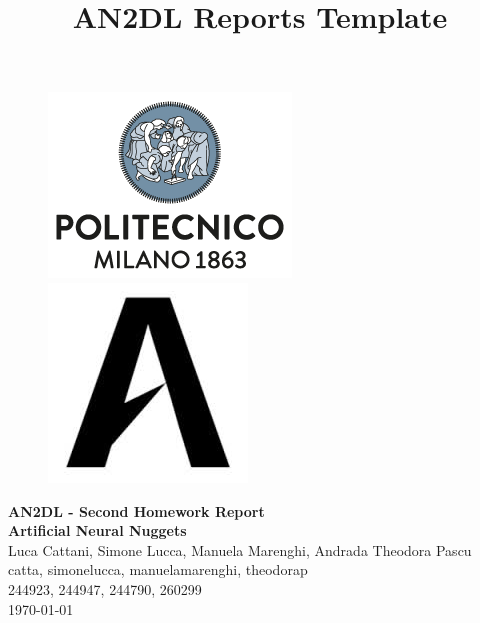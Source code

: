 \documentclass[11pt]{article}
\title{AN2DL Reports Template}
\begin{document}
    
    \begin{figure}[H]
        \raggedright
        \includegraphics[scale=0.4]{polimi.png} \hfill \includegraphics[scale=0.3]{airlab.jpeg}
    \end{figure}

  
    \vspace{5mm}
    
    \begin{center}
        {\Large \textbf{AN2DL - Second Homework Report}}\\
        \vspace{2mm}
        {\Large \textbf{Artificial Neural Nuggets}}\\
        \vspace{2mm}
        {\large Luca Cattani,}
        {\large Simone Lucca,}
        {\large Manuela Marenghi,}
        {\large Andrada Theodora Pascu}\\
        \vspace{2mm}
        {catta,}
        {simonelucca,}
        {manuelamarenghi,}
        {theodorap}\\
        \vspace{2mm}
        {244923,}
        {244947,}
        {244790,}
        {260299}\\
        \vspace{5mm}
        \today
    \end{center}    
    \vspace{5mm}
    
\end{document}
